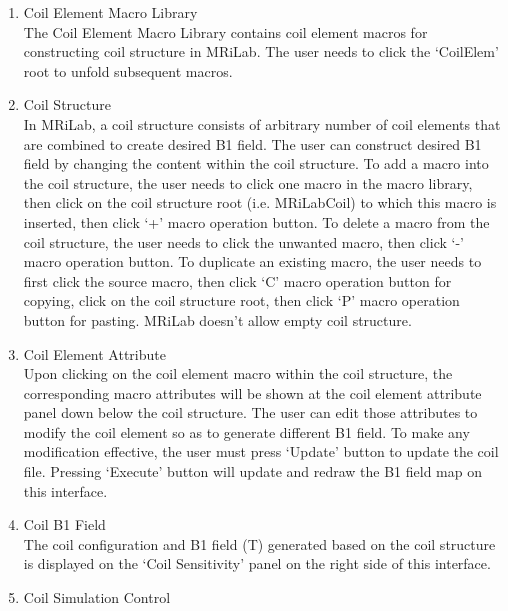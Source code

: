 \documentclass{book}%
\begin{document}
\begin{enumerate}
	\item Coil Element Macro Library \\
	
The Coil Element Macro Library contains coil element macros for constructing coil structure in MRiLab. The user needs to click the `CoilElem' root to unfold subsequent macros.

	\item Coil Structure \\
	
In MRiLab, a coil structure consists of arbitrary number of coil elements that are combined to create desired B1 field. The user can construct desired B1 field by changing the content within the coil structure. To add a macro into the coil structure, the user needs to click one macro in the macro library, then click on the coil structure root (i.e. MRiLabCoil) to which this macro is inserted, then click `+' macro operation button. To delete a macro from the coil structure, the user needs to click the unwanted macro, then click `-' macro operation button. To duplicate an existing macro, the user needs to first click the source macro, then click `C' macro operation button for copying, click on the coil structure root, then click `P' macro operation button for pasting. MRiLab doesn't allow empty coil structure.
	
	
	\item Coil Element Attribute \\
	
Upon clicking on the coil element macro within the coil structure, the corresponding macro attributes will be shown at the coil element attribute panel down below the coil structure. The user can edit those attributes to modify the coil element so as to generate different B1 field. To make any modification effective, the user must press `Update' button to update the coil file. Pressing `Execute' button will update and redraw the B1 field map on this interface.
	
	\item Coil B1 Field \\

The coil configuration and B1 field (T) generated based on the coil structure is displayed on the `Coil Sensitivity' panel on the right side of this interface.
	
	\item Coil Simulation Control \\


\end{enumerate}
\end{document}
